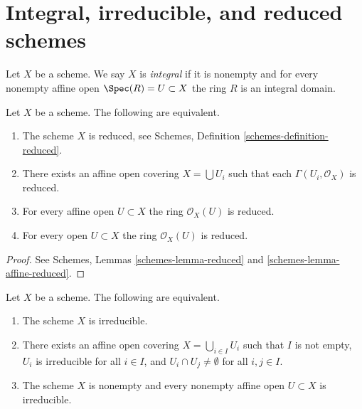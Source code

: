 \section{Integral, irreducible, and reduced schemes}
\label{section-integral}

\begin{definition}
\label{definition-integral}
Let $X$ be a scheme. We say $X$ is {\it integral} if it is nonempty and
for every nonempty affine open $\Spec(R) = U \subset X$ the ring $R$
is an integral domain.
\end{definition}

\begin{lemma}
\label{lemma-characterize-reduced}
Let $X$ be a scheme.
The following are equivalent.
\begin{enumerate}
\item The scheme $X$ is reduced, see
Schemes, Definition \ref{schemes-definition-reduced}.
\item There exists an affine open covering $X = \bigcup U_i$
such that each $\Gamma(U_i, \mathcal{O}_X)$ is reduced.
\item For every affine open $U \subset X$ the ring
$\mathcal{O}_X(U)$ is reduced.
\item For every open $U \subset X$ the ring $\mathcal{O}_X(U)$ is reduced.
\end{enumerate}
\end{lemma}

\begin{proof}
See Schemes, Lemmas \ref{schemes-lemma-reduced} and
\ref{schemes-lemma-affine-reduced}.
\end{proof}

\begin{lemma}
\label{lemma-characterize-irreducible}
Let $X$ be a scheme.
The following are equivalent.
\begin{enumerate}
\item The scheme $X$ is irreducible.
\item There exists an affine open covering $X = \bigcup_{i \in I} U_i$
such that $I$ is not empty, $U_i$ is irreducible for all $i \in I$, and
$U_i \cap U_j \not = \emptyset$ for all $i, j \in I$.
\item The scheme $X$ is nonempty and every nonempty affine open
$U \subset X$ is irreducible.
\end{enumerate}
\end{lemma}

